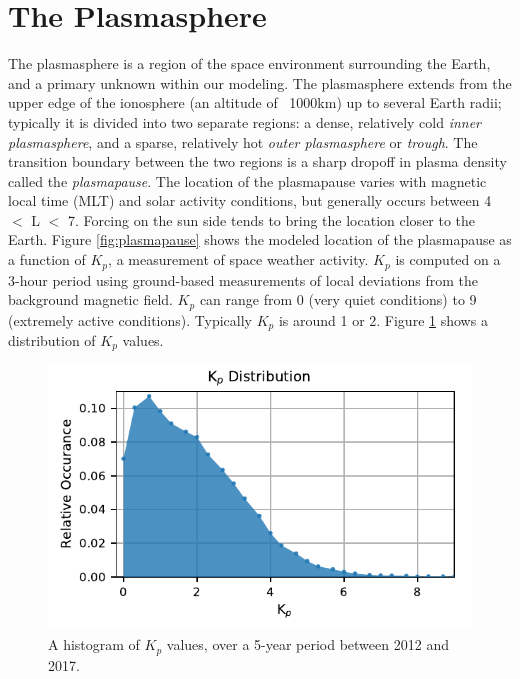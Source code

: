 \section{The Plasmasphere}
\label{section:plasmasphere_models}
The plasmasphere is a region of the space environment surrounding the Earth, and a primary unknown within our modeling. The plasmasphere extends from the upper edge of the ionosphere (an altitude of ~1000km) up to several Earth radii; typically it is divided into two separate regions: a dense, relatively cold \emph{inner plasmasphere}, and a sparse, relatively hot \emph{outer plasmasphere} or \emph{trough}. The transition boundary between the two regions is a sharp dropoff in plasma density called the \emph{plasmapause}. The location of the plasmapause varies with magnetic local time (MLT) and solar activity conditions, but generally occurs between 4 $<$ L $<$ 7. Forcing on the sun side tends to bring the location closer to the Earth. Figure \ref{fig:plasmapause} shows the modeled location of the plasmapause as a function of $K_p$, a measurement of space weather activity. $K_p$ is computed on a 3-hour period using ground-based measurements of local deviations from the background magnetic field. $K_p$ can range from 0 (very quiet conditions) to 9 (extremely active conditions). Typically $K_p$ is around 1 or 2. Figure \ref{fig:Kp_dist} shows a distribution of $K_p$ values. 

\begin{figure}[h]
\begin{center}
\includegraphics{figures/Kp_distribution.pdf}
\caption[Histogram of $K_p$ data]{A histogram of $K_p$ values, over a 5-year period between 2012 and 2017.}
\label{fig:Kp_dist}
\end{center}
\end{figure}


